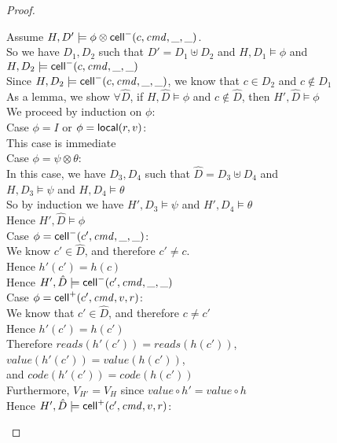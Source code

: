 \begin{proof}
  \begin{tabbedproof}
    \oo Assume $H, D' \models \phi \otimes \mathsf{cell}^{-}({c}, {\mathit{cmd}}, {\_}, {\_})$. \\
    \ooo So we have $D_1, D_2$ such that $D' = D_1 \uplus D_2$ and $H, D_1 \models \phi$ and $H, D_2 \models \mathsf{cell}^{-}({c}, {\mathit{cmd}}, {\_}, {\_})$ \\
    \ooo Since $H, D_2 \models \mathsf{cell}^{-}({c}, {\mathit{cmd}}, {\_}, {\_})$, we know that $c \in D_2$ and $c \not\in D_1$ \\
    \ooo As a lemma, we show $\forall \hat{D}$, if $H, \hat{D} \models \phi$ and $c \not \in \hat{D}$, then $H', \hat{D} \models \phi$ \\
    \ooo We proceed by induction on $\phi$: \\
    \oooo Case $\phi = I$ or $\phi = \mathsf{local}({r}, {v})$: \\
    \ooooo This case is immediate \\
    \oooo Case $\phi = \psi \otimes \theta$: \\
    \ooooo In this case, we have $D_3, D_4$ such that $\hat{D} = D_3 \uplus D_4$ and  \\
    \ooooox $H, D_3 \models \psi$ and $H, D_4 \models \theta$ \\
    \ooooo So by induction we have $H', D_3 \models \psi$ and $H', D_4 \models \theta$ \\
    \ooooo Hence $H', \hat{D} \models \phi$\\
    \oooo Case $\phi = \mathsf{cell}^{-}({c'}, {\mathit{cmd}}, {\_}, {\_})$: \\
    \ooooo We know $c' \in \hat{D}$, and therefore $c' \not= c$. \\
    \ooooo Hence $h'(c') = h(c)$ \\
    \ooooo Hence $H', \hat{D} \models \mathsf{cell}^{-}({c'}, {\mathit{cmd}}, {\_}, {\_})$ \\
    \oooo Case $\phi = \mathsf{cell}^{+}({c'}, {\mathit{cmd}}, {v}, {r})$: \\
    \ooooo We know that $c' \in \hat{D}$, and therefore $c \not= c'$ \\
    \ooooo Hence $h'(c') = h(c')$ \\
    \ooooo Therefore $\mathit{reads}(h'(c')) = \mathit{reads}(h(c'))$, $\mathit{value}(h'(c')) = \mathit{value}(h(c'))$, \\
    \oooox and $\mathit{code}(h'(c')) = \mathit{code}(h(c'))$ \\ 
    \ooooo Furthermore, $V_{H'} = V_H$ since $\mathit{value} \circ h' = \mathit{value} \circ h$\\
    \ooooo Hence $H', \hat{D} \models \mathsf{cell}^{+}({c'}, {\mathit{cmd}}, {v}, {r})$: \\

\end{tabbedproof}
\end{proof}
